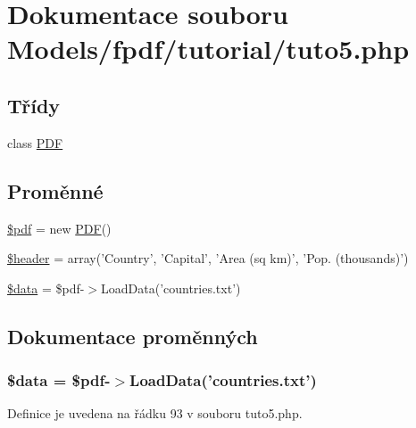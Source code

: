 \hypertarget{tuto5_8php}{\section{Dokumentace souboru Models/fpdf/tutorial/tuto5.php}
\label{tuto5_8php}
}
\subsection*{Třídy}
\begin{DoxyCompactItemize}
\item 
class \hyperlink{class_p_d_f}{P\-D\-F}
\end{DoxyCompactItemize}
\subsection*{Proměnné}
\begin{DoxyCompactItemize}
\item 
\hyperlink{tuto5_8php_a964ee5ee597c515cbb4dad2f14054cb4}{\$pdf} = new \hyperlink{class_p_d_f}{P\-D\-F}()
\item 
\hyperlink{tuto5_8php_a4f44601f2b9dc8a1644bce53c94ce622}{\$header} = array('Country', 'Capital', 'Area (sq km)', 'Pop. (thousands)')
\item 
\hyperlink{tuto5_8php_a6efc15b5a2314dd4b5aaa556a375c6d6}{\$data} = \$pdf-\/$>$Load\-Data('countries.\-txt')
\end{DoxyCompactItemize}


\subsection{Dokumentace proměnných}
\hypertarget{tuto5_8php_a6efc15b5a2314dd4b5aaa556a375c6d6}{
\subsubsection[{\$data}]{\setlength{\rightskip}{0pt plus 5cm}\$data = \$pdf-\/$>$Load\-Data('countries.\-txt')}}\label{tuto5_8php_a6efc15b5a2314dd4b5aaa556a375c6d6}


Definice je uvedena na řádku 93 v souboru tuto5.\-php.



